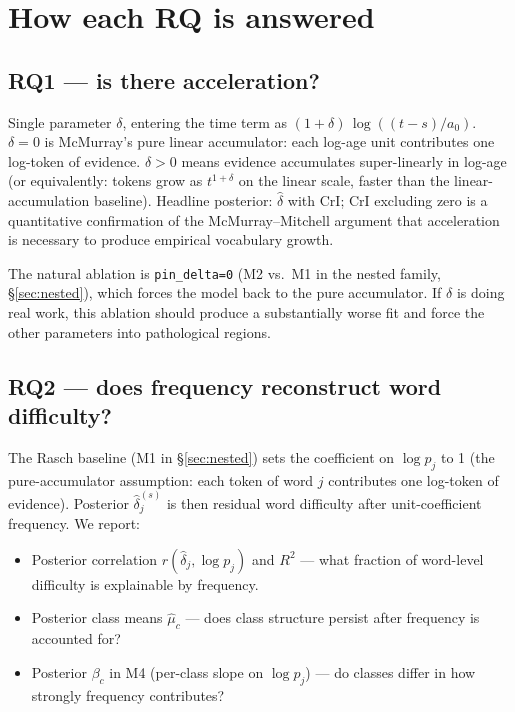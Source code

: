 \documentclass[11pt]{article}
\begin{document}
\section{How each RQ is answered}

\subsection*{RQ1 — is there acceleration?}

Single parameter \(\delta\), entering the time term as
\((1 + \delta)\,\log\!((t-s)/a_0)\).  \(\delta = 0\) is McMurray's
pure linear accumulator: each log-age unit contributes one log-token of
evidence. \(\delta > 0\) means evidence accumulates super-linearly in
log-age (or equivalently: tokens grow as \(t^{1+\delta}\) on the
linear scale, faster than the linear-accumulation baseline). Headline
posterior: \(\hat\delta\) with CrI; CrI excluding zero is a
quantitative confirmation of the McMurray–Mitchell argument that
acceleration is necessary to produce empirical vocabulary growth.

The natural ablation is \texttt{pin\_delta=0} (M2 vs.\ M1 in the
nested family, §\ref{sec:nested}), which forces the model back to
the pure accumulator. If \(\delta\) is doing real work, this ablation
should produce a substantially worse fit and force the other
parameters into pathological regions.

\subsection*{RQ2 — does frequency reconstruct word difficulty?}

The Rasch baseline (M1 in §\ref{sec:nested}) sets the coefficient on
\(\log p_j\) to 1 (the pure-accumulator assumption: each token of
word \(j\) contributes one log-token of evidence). Posterior
\(\hat\delta_j^{(s)}\) is then residual word difficulty after
unit-coefficient frequency. We report:

\begin{itemize}[leftmargin=1.3em]
\item Posterior correlation \(r(\hat\delta_j, \log p_j)\) and \(R^2\) —
  what fraction of word-level difficulty is explainable by frequency.
\item Posterior class means \(\hat\mu_c\) — does class structure
  persist after frequency is accounted for?
\item Posterior \(\beta_c\) in M4 (per-class slope on \(\log p_j\)) —
  do classes differ in how strongly frequency contributes?
\end{itemize}
\end{document}
